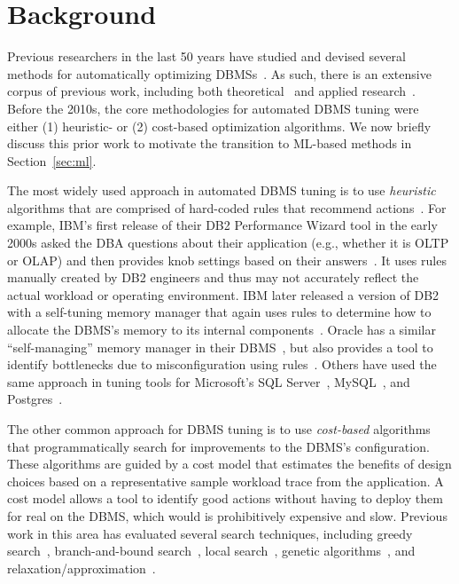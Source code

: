 \documentclass[11pt,times]{article}
\begin{document}
\section{Background}
\label{sec:background}
Previous researchers in the last 50 years have studied and devised several methods for 
automatically optimizing DBMSs~\cite{bernstein98,chaudhuri00,chaudhuri07,weikum02}. As such, there 
is an extensive corpus of previous work, including both theoretical~\cite{ceri83} and applied 
research~\cite{duan09,zilio04,wiese08}.
Before the 2010s, the core methodologies for automated DBMS tuning were
either (1) heuristic- or (2) cost-based optimization algorithms. We now briefly discuss this prior 
work to motivate the transition to ML-based methods in Section~\ref{sec:ml}.

The most widely used approach in automated DBMS tuning is to use \textit{heuristic} algorithms 
that are comprised of hard-coded rules that recommend 
actions~\cite{hammer79}. For example, IBM's first release of their 
DB2 Performance Wizard tool in the early 2000s asked the DBA questions about their application 
(e.g., whether it is 
OLTP or OLAP) and then provides knob settings based on their answers~\cite{ibmdb02}. It uses rules 
manually created by DB2 engineers and thus may not accurately reflect the actual workload or 
operating environment. IBM 
later released a version of DB2 with a self-tuning memory manager that again uses rules to 
determine how to allocate the DBMS's memory to its internal components~\cite{storm06,tian03}. 
Oracle has a similar ``self-managing'' memory manager in their DBMS~\cite{dageville02}, but also 
provides a tool to identify bottlenecks due to misconfiguration using rules~\cite{dias05,kumar03}.
Others have used the same approach in tuning tools for Microsoft's SQL 
Server~\cite{narayanan05}, MySQL~\cite{mysql-tuning-primer}, and Postgres~\cite{postgres-pgtune}.

The other common approach for DBMS tuning is to use \textit{cost-based} algorithms that 
programmatically search for improvements to the DBMS's configuration. 
These algorithms are guided by a cost model that estimates the benefits of design choices based on 
a representative sample workload trace from the application. 
A cost model allows a tool to identify good actions without having to deploy them for real on the 
DBMS, which would is prohibitively expensive and slow.
Previous work in this area has evaluated several search techniques, including 
greedy search~\cite{chaudhuri97}, branch-and-bound search~\cite{pavlo12,zilio04,nehme11}, local 
search~\cite{xi04}, genetic algorithms~\cite{nehme11}, and relaxation/approximation~\cite{bruno05}. 
\end{document}
